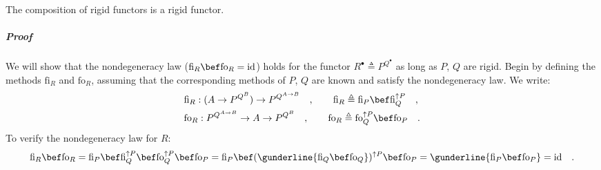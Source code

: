 The composition of rigid functors is a rigid functor.

\subparagraph{Proof}

We will show that the nondegeneracy law ($\text{fi}_{R}\bef\text{fo}_{R}=\text{id}$)
holds for the functor $R^{\bullet}\triangleq P^{Q^{\bullet}}$ as
long as $P$, $Q$ are rigid. Begin by defining the methods $\text{fi}_{R}$
and $\text{fo}_{R}$, assuming that the corresponding methods of $P$,
$Q$ are known and satisfy the nondegeneracy law. We write:
\begin{align*}
 & \text{fi}_{R}:(A\rightarrow P^{Q^{B}})\rightarrow P^{Q^{A\rightarrow B}}\quad,\quad\quad\text{fi}_{R}\triangleq\text{fi}_{P}\bef\text{fi}_{Q}^{\uparrow P}\quad,\\
 & \text{fo}_{R}:P^{Q^{A\rightarrow B}}\rightarrow A\rightarrow P^{Q^{B}}\quad,\quad\quad\text{fo}_{R}\triangleq\text{fo}_{Q}^{\uparrow P}\bef\text{fo}_{P}\quad.
\end{align*}
To verify the nondegeneracy law for $R$:
\[
\text{fi}_{R}\bef\text{fo}_{R}=\text{fi}_{P}\bef\text{fi}_{Q}^{\uparrow P}\bef\text{fo}_{Q}^{\uparrow P}\bef\text{fo}_{P}=\text{fi}_{P}\bef(\gunderline{\text{fi}_{Q}\bef\text{fo}_{Q}})^{\uparrow P}\bef\text{fo}_{P}=\gunderline{\text{fi}_{P}\bef\text{fo}_{P}}=\text{id}\quad.
\]
